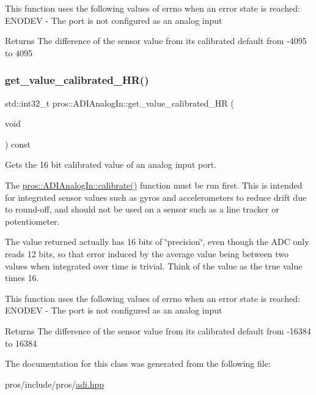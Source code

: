 This function uses the following values of errno when an error state is reached\+: E\+N\+O\+D\+EV -\/ The port is not configured as an analog input

\begin{DoxyReturn}{Returns}
The difference of the sensor value from its calibrated default from -\/4095 to 4095 
\end{DoxyReturn}
\mbox{\label{classpros_1_1ADIAnalogIn_a65bfed175ed1b0efce4566e78e7f9473}} 
\subsubsection{\texorpdfstring{get\+\_\+value\+\_\+calibrated\+\_\+\+H\+R()}{get\_value\_calibrated\_HR()}}
{\footnotesize\ttfamily std\+::int32\+\_\+t pros\+::\+A\+D\+I\+Analog\+In\+::get\+\_\+value\+\_\+calibrated\+\_\+\+HR (\begin{DoxyParamCaption}\item[{void}]{ }\end{DoxyParamCaption}) const}

Gets the 16 bit calibrated value of an analog input port.

The \hyperlink{classpros_1_1ADIAnalogIn_ac8dd1e625cbcec4951d20be0c0fa2d3c}{pros\+::\+A\+D\+I\+Analog\+In\+::calibrate()} function must be run first. This is intended for integrated sensor values such as gyros and accelerometers to reduce drift due to round-\/off, and should not be used on a sensor such as a line tracker or potentiometer.

The value returned actually has 16 bits of \char`\"{}precision\char`\"{}, even though the A\+DC only reads 12 bits, so that error induced by the average value being between two values when integrated over time is trivial. Think of the value as the true value times 16.

This function uses the following values of errno when an error state is reached\+: E\+N\+O\+D\+EV -\/ The port is not configured as an analog input

\begin{DoxyReturn}{Returns}
The difference of the sensor value from its calibrated default from -\/16384 to 16384 
\end{DoxyReturn}


The documentation for this class was generated from the following file\+:\begin{DoxyCompactItemize}
\item 
pros/include/pros/\hyperlink{adi_8hpp}{adi.\+hpp}\end{DoxyCompactItemize}

